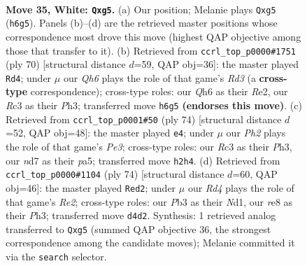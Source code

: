 \documentclass[11pt]{article}
\begin{document}
\clearpage

\begin{figure}[p]\centering
\begin{subfigure}{0.46\textwidth}\centering
\resizebox{\linewidth}{!}{%
\newchessgame
\chessboard[
  setfen={4r3/kp1np3/1r1p3Q/1b4p1/3RP3/1PR2P2/6PP/1K6 w - - 3 35},
  showmover=false,
  pgfstyle=straightmove, color=movearrow, markmove={h6-g5}
]}
\caption{}
\end{subfigure}\hfill
\begin{subfigure}{0.46\textwidth}\centering
\resizebox{\linewidth}{!}{%
\newchessgame
\chessboard[
  setfen={6k1/5p2/4r3/pp2r2p/8/2PRp1PP/PP2R1K1/8 w - - 4 36},
  showmover=false,
  pgfstyle=straightmove, color=movearrow, markmove={d3-d4}
]}
\caption{}
\end{subfigure}
\\[4pt]
\begin{subfigure}{0.46\textwidth}\centering
\resizebox{\linewidth}{!}{%
\newchessgame
\chessboard[
  setfen={1r6/1r3kp1/5p1p/pp1R4/8/PR2P2P/5PP1/7K w - - 2 38},
  showmover=false,
  pgfstyle=straightmove, color=movearrow, markmove={e3-e4}
]}
\caption{}
\end{subfigure}\hfill
\begin{subfigure}{0.46\textwidth}\centering
\resizebox{\linewidth}{!}{%
\newchessgame
\chessboard[
  setfen={5k2/pb2rr1p/1p4p1/8/PPPRp3/7P/4R1P1/3N2K1 w - - 3 38},
  showmover=false,
  pgfstyle=straightmove, color=movearrow, markmove={e2-d2}
]}
\caption{}
\end{subfigure}
\caption{\textbf{Move 35, White: \texttt{Qxg5}.} (a) Our position; Melanie plays \texttt{Qxg5} (\texttt{h6g5}). Panels (b)--(d) are the retrieved master positions whose correspondence most drove this move (highest QAP objective among those that transfer to it). (b) Retrieved from \texttt{ccrl\_top\_p0000\#1751} (ply 70) [structural distance $d$=59, QAP obj=36]: the master played \texttt{Rd4}; under $\mu$ our \emph{Qh6} plays the role of that game's \emph{Rd3} (a \textbf{cross-type} correspondence); cross-type roles: our \emph{Q}h6 as their \emph{R}e2, our \emph{R}c3 as their \emph{P}h3; transferred move \texttt{h6g5} \textbf{(endorses this move)}. (c) Retrieved from \texttt{ccrl\_top\_p0001\#50} (ply 74) [structural distance $d$=52, QAP obj=48]: the master played \texttt{e4}; under $\mu$ our \emph{Ph2} plays the role of that game's \emph{Pe3}; cross-type roles: our \emph{R}c3 as their \emph{P}h3, our \emph{n}d7 as their \emph{p}a5; transferred move \texttt{h2h4}. (d) Retrieved from \texttt{ccrl\_top\_p0000\#1104} (ply 74) [structural distance $d$=60, QAP obj=46]: the master played \texttt{Red2}; under $\mu$ our \emph{Rd4} plays the role of that game's \emph{Re2}; cross-type roles: our \emph{P}b3 as their \emph{N}d1, our \emph{r}e8 as their \emph{P}h3; transferred move \texttt{d4d2}. Synthesis: 1 retrieved analog transferred to \texttt{Qxg5} (summed QAP objective 36, the strongest correspondence among the candidate moves); Melanie committed it via the \texttt{search} selector.}
\label{fig:thought-m68}
\end{figure}
\end{document}
